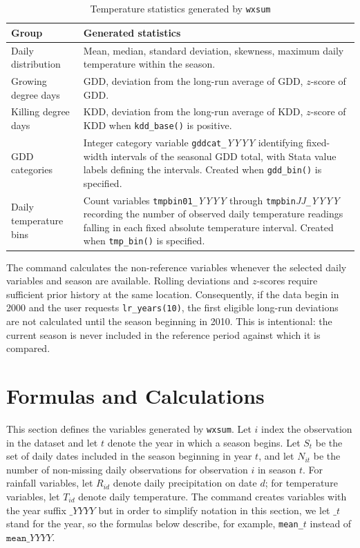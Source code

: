 \begin{table}[htbp]
	\caption{Temperature statistics generated by \texttt{wxsum}}
	\label{tab:tempout}
	\begin{center}
		\begin{tabularx}{\textwidth}{lX}
			\hline
			Group & Generated statistics \\
			\hline
			Daily distribution & Mean, median, standard deviation, skewness, maximum daily temperature within the season. \\
			Growing degree days & GDD, deviation from the long-run average of GDD, $z$-score of GDD. \\
			Killing degree days & KDD, deviation from the long-run average of KDD, $z$-score of KDD when \texttt{kdd\_base()} is positive. \\
			GDD categories & Integer category variable \texttt{gddcat\_}\textit{YYYY} identifying fixed-width intervals of the seasonal GDD total, with Stata value labels defining the intervals. Created when \texttt{gdd\_bin()} is specified. \\
			Daily temperature bins & Count variables \texttt{tmpbin01\_}\textit{YYYY} through \texttt{tmpbin}\textit{JJ}\texttt{\_}\textit{YYYY} recording the number of observed daily temperature readings falling in each fixed absolute temperature interval. Created when \texttt{tmp\_bin()} is specified. \\
			\hline
		\end{tabularx}
	\end{center}
\end{table}

The command calculates the non-reference variables whenever the selected daily variables and season are available. Rolling deviations and $z$-scores require sufficient prior history at the same location. Consequently, if the data begin in 2000 and the user requests \texttt{lr\_years(10)}, the first eligible long-run deviations are not calculated until the season beginning in 2010. This is intentional: the current season is never included in the reference period against which it is compared.

\section{Formulas and Calculations}

This section defines the variables generated by \texttt{wxsum}. Let $i$ index the observation in the dataset and let $t$ denote the year in which a season begins. Let $S_t$ be the set of daily dates included in the season beginning in year $t$, and let $N_{it}$ be the number of non-missing daily observations for observation $i$ in season $t$. For rainfall variables, let $R_{id}$ denote daily precipitation on date $d$; for temperature variables, let $T_{id}$ denote daily temperature. The command creates variables with the year suffix $\_\textit{YYYY}$ but in order to simplify notation in this section, we let $\_t$ stand for the year, so the formulas below describe, for example, \texttt{mean\_}$t$ instead of $\texttt{mean\_}\textit{YYYY}$.

